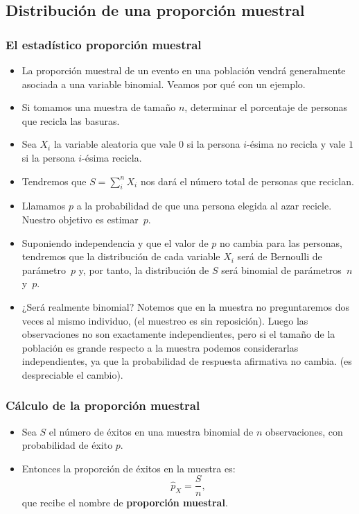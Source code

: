     \subsection{Distribución de una proporción muestral}
\begin{frame}
    \frametitle{El estadístico proporción muestral}
\begin{itemize}
  \item  La proporción muestral de un evento en una población vendrá
    generalmente asociada a una variable binomial. Veamos por qué con un ejemplo.
\item 
    Si tomamos una muestra de tamaño $n$, determinar
    el porcentaje de personas que recicla las basuras. 
\item Sea $X_i$ la variable aleatoria que vale $0$ si la persona $i$-ésima no recicla y vale $1$ si la persona $i$-ésima recicla.
\item Tendremos que $S=\sum_{i}^{n}X_i$ nos dará el número total de personas que reciclan.
\item Llamamos $p$ a la probabilidad de que una persona elegida al azar recicle. Nuestro objetivo es estimar~$p$.
\item Suponiendo independencia y que el valor de $p$ no cambia para las personas, tendremos que la distribución de cada variable $X_i$ será 
de Bernoulli de parámetro~$p$ y, por tanto, la distribución de $S$ será binomial de 
parámetros~$n$ y~$p$.
\end{itemize}
\end{frame}
\begin{frame}
\begin{itemize}
\item  ¿Será realmente binomial? Notemos que en la
    muestra no preguntaremos dos veces al mismo individuo, (el muestreo es sin reposición).
    Luego las observaciones no son exactamente independientes,
    pero si el tamaño de la población es grande respecto a
    la muestra podemos considerarlas independientes, ya que la probabilidad de respuesta afirmativa no cambia.
    (es despreciable el cambio).
\end{itemize}
\end{frame}

\begin{frame}
\frametitle{Cálculo de la proporción muestral}
\begin{itemize}
\item Sea $S$ el número de éxitos en una muestra binomial de $n$
    observaciones, con probabilidad de éxito $p$.
\item  Entonces la
    proporción de éxitos en la muestra es:
    $$\hat{p}_{X}=\frac{S}{n},$$
  que recibe el nombre de  \textbf{proporción muestral}.
\end{itemize}
\end{frame}

